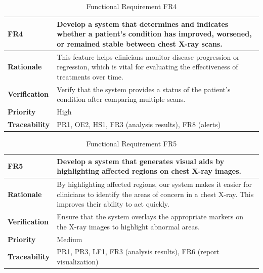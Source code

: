 \documentclass[12pt]{article}
\begin{document}
\begin{table}[h!]
\centering
{}
\begin{tabular}{|p{3.5cm}|p{11.5cm}|}
\hline
\rowcolor{gray!30}
\textbf{FR4} & Develop a system that determines and indicates whether a patient's condition has improved, worsened, or remained stable between chest X-ray scans. \\
\hline
\textbf{Rationale} & This feature helps clinicians monitor disease progression or regression, which is vital for evaluating the effectiveness of treatments over time.\\
\hline
\textbf{Verification} & Verify that the system provides a status of the patient's condition after comparing multiple scans. \\
\hline
\textbf{Priority} & High \\
\hline
\textbf{Traceability} & PR1, OE2, HS1, FR3 (analysis results), FR8 (alerts) \\
\hline
\end{tabular}
\caption{Functional Requirement FR4}
\end{table}
\begin{table}[h!]
\centering
{}
\begin{tabular}{|p{3.5cm}|p{11.5cm}|}
\hline
\rowcolor{gray!30}
\textbf{FR5} & Develop a system that generates visual aids by highlighting affected regions on chest X-ray images. \\
\hline
\textbf{Rationale} & By highlighting affected regions, our system makes it easier for clinicians to identify the areas of concern in a chest X-ray. This improves their ability to act quickly. \\
\hline
\textbf{Verification} & Ensure that the system overlays the appropriate markers on the X-ray images to highlight abnormal areas. \\
\hline
\textbf{Priority} & Medium\\
\hline
\textbf{Traceability} & PR1, PR3, LF1, FR3 (analysis results), FR6 (report visualization) \\
\hline
\end{tabular}
\caption{Functional Requirement FR5}
\end{table}
\end{document}
